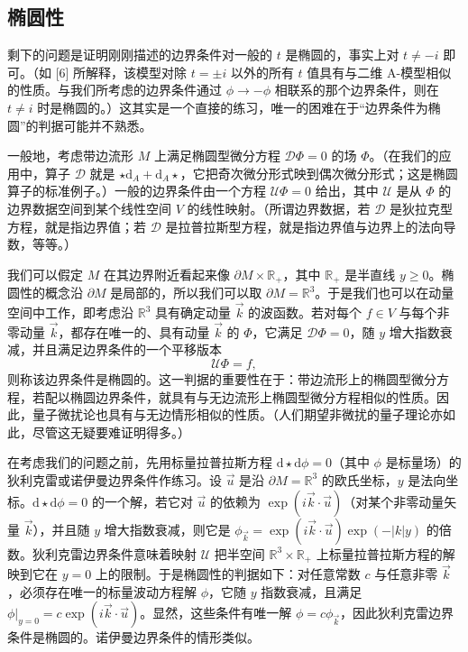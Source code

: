 \documentclass[11pt,a4paper,UTF8]{ctexart}
\theoremstyle{plain}
\theoremstyle{definition}
\begin{document}
\subsection{椭圆性}

剩下的问题是证明刚刚描述的边界条件对一般的 $t$ 是椭圆的，事实上对 $t\neq -i$ 即可。（如 [6] 所解释，该模型对除 $t=\pm i$ 以外的所有 $t$ 值具有与二维 A-模型相似的性质。与我们所考虑的边界条件通过 $\phi\to-\phi$ 相联系的那个边界条件，则在 $t\neq i$ 时是椭圆的。）这其实是一个直接的练习，唯一的困难在于“边界条件为椭圆”的判据可能并不熟悉。

一般地，考虑带边流形 $M$ 上满足椭圆型微分方程 $\mathcal{D}\Phi=0$ 的场 $\Phi$。（在我们的应用中，算子 $\mathcal{D}$ 就是 $\star\mathrm{d}_A+\mathrm{d}_A\star$，它把奇次微分形式映到偶次微分形式；这是椭圆算子的标准例子。）一般的边界条件由一个方程 $\mathcal{U}\Phi=0$ 给出，其中 $\mathcal{U}$ 是从 $\Phi$ 的边界数据空间到某个线性空间 $V$ 的线性映射。（所谓边界数据，若 $\mathcal{D}$ 是狄拉克型方程，就是指边界值；若 $\mathcal{D}$ 是拉普拉斯型方程，就是指边界值与边界上的法向导数，等等。）

我们可以假定 $M$ 在其边界附近看起来像 $\partial M\times\mathbb{R}_+$，其中 $\mathbb{R}_+$ 是半直线 $y\ge 0$。椭圆性的概念沿 $\partial M$ 是局部的，所以我们可以取 $\partial M=\mathbb{R}^3$。于是我们也可以在动量空间中工作，即考虑沿 $\mathbb{R}^3$ 具有确定动量 $\vec{k}$ 的波函数。若对每个 $f\in V$ 与每个非零动量 $\vec{k}$，都存在唯一的、具有动量 $\vec{k}$ 的 $\Phi$，它满足 $\mathcal{D}\Phi=0$，随 $y$ 增大指数衰减，并且满足边界条件的一个平移版本
\begin{equation}
    \mathcal{U}\Phi=f ,
    \tag{A.9}
\end{equation}
则称该边界条件是椭圆的。这一判据的重要性在于：带边流形上的椭圆型微分方程，若配以椭圆边界条件，就具有与无边流形上椭圆型微分方程相似的性质。因此，量子微扰论也具有与无边情形相似的性质。（人们期望非微扰的量子理论亦如此，尽管这无疑要难证明得多。）


在考虑我们的问题之前，先用标量拉普拉斯方程 $\mathrm{d}\star\mathrm{d}\phi=0$（其中 $\phi$ 是标量场）的狄利克雷或诺伊曼边界条件作练习。设 $\vec{u}$ 是沿 $\partial M=\mathbb{R}^3$ 的欧氏坐标，$y$ 是法向坐标。$\mathrm{d}\star\mathrm{d}\phi=0$ 的一个解，若它对 $\vec{u}$ 的依赖为 $\exp(i\vec{k}\cdot\vec{u})$（对某个非零动量矢量 $\vec{k}$），并且随 $y$ 增大指数衰减，则它是 $\phi_{\vec{k}}=\exp(i\vec{k}\cdot\vec{u})\exp(-|k|y)$ 的倍数。狄利克雷边界条件意味着映射 $\mathcal{U}$ 把半空间 $\mathbb{R}^3\times\mathbb{R}_+$ 上标量拉普拉斯方程的解映到它在 $y=0$ 上的限制。于是椭圆性的判据如下：对任意常数 $c$ 与任意非零 $\vec{k}$，必须存在唯一的标量波动方程解 $\phi$，它随 $y$ 指数衰减，且满足 $\phi|_{y=0}=c\exp(i\vec{k}\cdot\vec{u})$。显然，这些条件有唯一解 $\phi=c\phi_{\vec{k}}$，因此狄利克雷边界条件是椭圆的。诺伊曼边界条件的情形类似。
\end{document}
